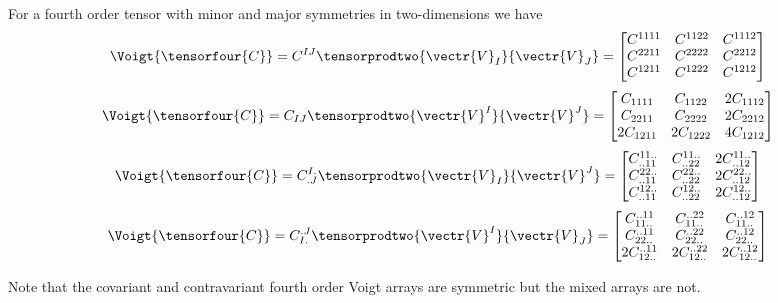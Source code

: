 For a fourth order tensor with minor and major symmetries in two-dimensions we have
\begin{equation}
  \Voigt{\tensorfour{C}}=C^{IJ}\tensorprodtwo{\vectr{V}_{I}}{\vectr{V}_{J}}=\begin{bmatrix}
    C^{1111} & C^{1122} & C^{1112} \\
    C^{2211} & C^{2222} & C^{2212} \\
    C^{1211} & C^{1222} & C^{1212}     
  \end{bmatrix}
\end{equation}
\begin{equation}
  \Voigt{\tensorfour{C}}=C_{IJ}\tensorprodtwo{\vectr{V}^{I}}{\vectr{V}^{J}}=\begin{bmatrix}
    C_{1111} & C_{1122} & 2C_{1112} \\
    C_{2211} & C_{2222} & 2C_{2212} \\
    2C_{1211} & 2C_{1222} & 4C_{1212}     
  \end{bmatrix}
\end{equation}
\begin{equation}
  \Voigt{\tensorfour{C}}=C^{I.}_{.J}\tensorprodtwo{\vectr{V}_{I}}{\vectr{V}^{J}}=\begin{bmatrix}
    C^{11..}_{..11} & C^{11..}_{..22} & 2C^{11..}_{..12} \\
    C^{22..}_{..11} & C^{22..}_{..22} & 2C^{22..}_{..12} \\
    C^{12..}_{..11} & C^{12..}_{..22} & 2C^{12..}_{..12}     
  \end{bmatrix}
\end{equation}
\begin{equation}
  \Voigt{\tensorfour{C}}=C^{.J}_{I.}\tensorprodtwo{\vectr{V}^{I}}{\vectr{V}_{J}}=\begin{bmatrix}
    C^{..11}_{11..} & C^{..22}_{11..} & C^{..12}_{11..} \\
    C^{..11}_{22..} & C^{..22}_{22..} & C^{..12}_{22..} \\
    2C^{..11}_{12..} & 2C^{..22}_{12..} & 2C^{..12}_{12..}     
  \end{bmatrix}
\end{equation}

Note that the covariant and contravariant fourth order Voigt arrays are symmetric but the mixed arrays are not.

